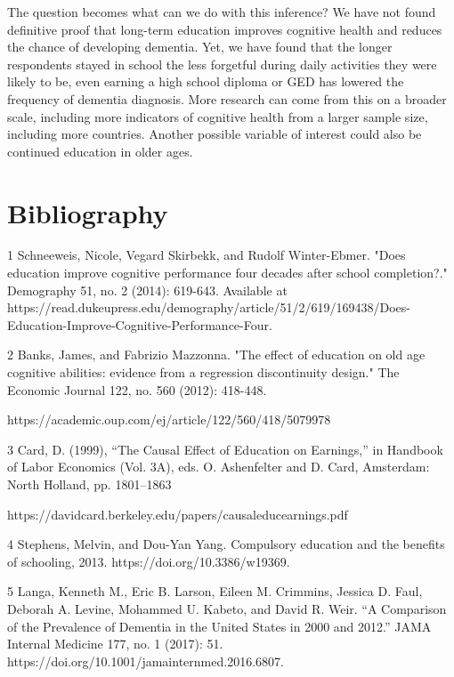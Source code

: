 \documentclass{article}
\begin{document}
The question becomes what can we do with this inference? We have not found definitive proof that long-term education improves cognitive health and reduces the chance of developing dementia. Yet, we have found that the longer respondents stayed in school the less forgetful during daily activities they were likely to be, even earning a high school diploma or GED has lowered the frequency of dementia diagnosis. More research can come from this on a broader scale, including more indicators of cognitive health from a larger sample size, including more countries. Another possible variable of interest could also be continued education in older ages.

\newpage
\section*{Bibliography}
\singlespacing 
\hspace*{1em} 1  Schneeweis, Nicole, Vegard Skirbekk, and Rudolf Winter-Ebmer. "Does education improve cognitive performance four decades after school completion?." Demography 51, no. 2 (2014): 619-643. Available at https://read.dukeupress.edu/demography/article/51/2/619/169438/Does-Education-Improve-Cognitive-Performance-Four.

2  Banks, James, and Fabrizio Mazzonna. "The effect of education on old age cognitive abilities: evidence from a regression discontinuity design." The Economic Journal 122, no.
560 (2012): 418-448.

https://academic.oup.com/ej/article/122/560/418/5079978


3 Card, D. (1999), “The Causal Effect of Education on Earnings,” in Handbook of Labor Economics 
     (Vol. 3A), eds. O. Ashenfelter and D. Card, Amsterdam: North Holland, pp. 1801–1863 

https://davidcard.berkeley.edu/papers/causaleducearnings.pdf


4  Stephens, Melvin, and Dou-Yan Yang. Compulsory education and the benefits of schooling, 2013. https://doi.org/10.3386/w19369.


5  Langa, Kenneth M., Eric B. Larson, Eileen M. Crimmins, Jessica D. Faul, Deborah A. Levine, Mohammed U. Kabeto, and David R. Weir. “A Comparison of the Prevalence of Dementia in the United States in 2000 and 2012.” JAMA Internal Medicine 177, no. 1 (2017): 51. https://doi.org/10.1001/jamainternmed.2016.6807.
\setlength\bibsep{10pt}
\end{document}
